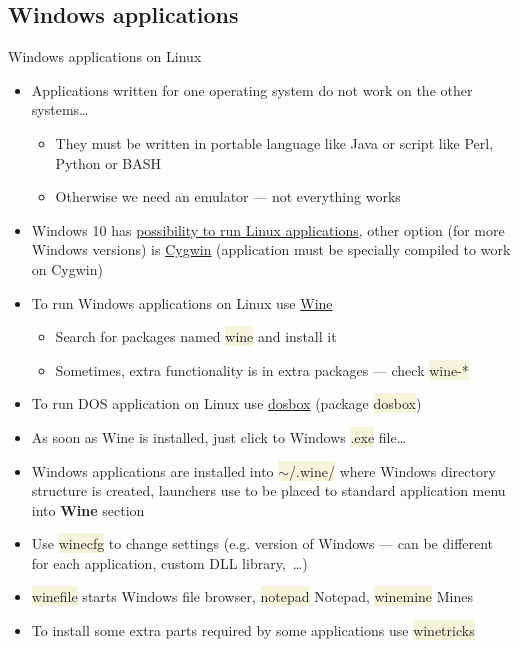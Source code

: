 \documentclass[compress, ucs, xelatex, 11pt, xcolor=svgnames, aspectratio=169,
	hyperref={
		bookmarks=true,
		unicode=true,
		colorlinks=true,
		pdftitle={Linux, command line and MetaCentrum},
		plainpages=false,
		pdfauthor={Vojtech Zeisek},
		pdfsubject={Course about use of Linux command line, writing shell scripts and using MetaCentrum of CESNET},
		pdfcreator={XeLaTeX},
		pdfkeywords={Linux, GNU, BASH, shell, command line, MetaCentrum},
		linkcolor=DarkRed, %
		anchorcolor=DarkBlue, %
		citecolor=Indigo, %
		filecolor=NavyBlue, %
		menucolor=DarkMagenta, %
		urlcolor=DarkBlue, %
		pdftex},
	url={hyphens, lowtilde} %
	]{beamer}
\renewcommand{\texttt}[1]{\colorbox{Beige}{{\ttfamily #1}}}
\begin{document}
\subsection{Windows applications}

\begin{frame}[allowframebreaks]{Windows applications on Linux}
	\begin{itemize}
		\item Applications written for one operating system do not work on the other systems\ldots
		\begin{itemize}
			\item They must be written in portable language like Java or script like Perl, Python or BASH
			\item Otherwise we need an emulator --- not everything works
		\end{itemize}
		\item Windows 10 has \href{https://docs.microsoft.com/windows/wsl/install-win10}{possibility to run Linux applications}, other option (for more Windows versions) is \href{https://www.cygwin.com/}{Cygwin} (application must be specially compiled to work on Cygwin)
		\item To run Windows applications on Linux use \href{https://www.winehq.org/}{Wine}
		\begin{itemize}
			\item Search for packages named \texttt{wine} and install it
			\item Sometimes, extra functionality is in extra packages --- check \texttt{wine-*}
		\end{itemize}
		\item To run DOS application on Linux use \href{https://www.dosbox.com/}{dosbox} (package \texttt{dosbox})
		\item As soon as Wine is installed, just click to Windows \texttt{*.exe} file\ldots
		\item Windows applications are installed into \texttt{$\sim$/.wine/} where Windows directory structure is created, launchers use to be placed to standard application menu into \textbf{Wine} section
		\item Use \texttt{winecfg} to change settings (e.g. version of Windows --- can be different for each application, custom DLL library,~\ldots)
		\item \texttt{winefile} starts Windows file browser, \texttt{notepad} Notepad, \texttt{winemine} Mines
		\item To install some extra parts required by some applications use \texttt{winetricks}

\end{itemize}
\end{frame}
\end{document}

